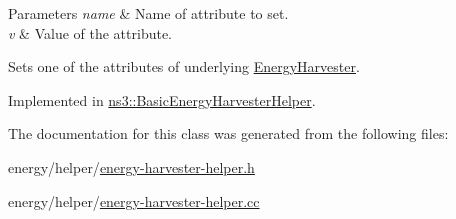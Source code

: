 \begin{DoxyParams}{Parameters}
{\em name} & Name of attribute to set. \\
\hline
{\em v} & Value of the attribute.\\
\hline
\end{DoxyParams}
Sets one of the attributes of underlying \hyperlink{classns3_1_1EnergyHarvester}{Energy\+Harvester}. 

Implemented in \hyperlink{classns3_1_1BasicEnergyHarvesterHelper_a7af58efc3f174e0bc3f0be7618da42cb}{ns3\+::\+Basic\+Energy\+Harvester\+Helper}.



The documentation for this class was generated from the following files\+:\begin{DoxyCompactItemize}
\item 
energy/helper/\hyperlink{energy-harvester-helper_8h}{energy-\/harvester-\/helper.\+h}\item 
energy/helper/\hyperlink{energy-harvester-helper_8cc}{energy-\/harvester-\/helper.\+cc}\end{DoxyCompactItemize}
